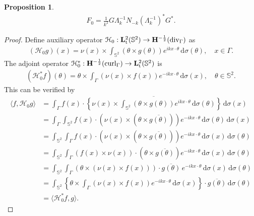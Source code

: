 \documentclass[a4paper,12pt]{article}
\theoremstyle{definition}
\newtheorem{prp}{Proposition}
\newcommand\bdr{\Gamma}
\newcommand\Div{\divv_\bdr}
\newcommand\Curl{\curl_\bdr}
\newcommand\lTT{{\bf L}^2_\text{t}}
\newcommand\lTS{\lTT(\mathbb{S}^2)}
\newcommand\Hhm{{\bf H}^{-\frac{1}{2}}}
\newcommand\lTD{\Hhm(\Div)}
\newcommand\lTC{\Hhm(\Curl)}
\newcommand\ints[2][y]{\int_{\bdr}#2\,\text{d}\sigma(#1)}
\newcommand\intc[2][(\theta)]{\int_{\mathbb{S}^2}#2\,\text{d}\sigma#1}
\DeclareMathOperator\curl{curl}
\DeclareMathOperator\divv{div}
\begin{document}
\begin{prp}
  \begin{align*}
    F_0 = \frac{1}{k^2}G\Lambda_k^{-1}N_{-k}\left(\Lambda_k^{-1}\right)^*G^*.
  \end{align*}
\end{prp}

\begin{proof}
  Define auxiliary operator $\mathcal{H}_0:\lTS\rightarrow\lTD$ as
  \begin{align}
    (\mathcal{H}_0 g)(x)=\nu(x)\times\intc{\left(\theta\times g(\theta)\right)e^{ikx\cdot\theta}},\quad x\in\bdr.
  \end{align}
  The adjoint operator $\mathcal{H}_0^*:\lTC\rightarrow\lTS$ is 
  \begin{align}
    (\mathcal{H}_0^*f)(\theta)=\theta\times\ints[x]{\left(\nu(x)\times f(x)\right)e^{-ik x\cdot\theta}},\quad\theta\in\mathbb{S}^2.
  \end{align}
  This can be verified by
  \begin{align*}
    \langle f, \mathcal{H}_0 g\rangle &= \ints[x]{f(x)\cdot\overline{\left\{\nu(x)\times\intc{\left(\theta\times g(\theta)\right)e^{i k x\cdot\theta}}\right\}}} \\
    &=\ints[x]{\intc{f(x)\cdot \left(\nu(x)\times\left(\theta\times\overline{g(\theta)}\right)\right)e^{-i k x\cdot\theta}}} \\
    &=\intc{\ints[x]{f(x)\cdot \left(\nu(x)\times\left(\theta\times\overline{g(\theta)}\right)\right)e^{-i k x\cdot\theta}}} \\
    &=\intc{\ints[x]{\left(f(x)\times\nu(x)\right)\cdot\left(\theta\times\overline{g(\theta)}\right)e^{-i k x\cdot\theta}}} \\
    &=\intc{\ints[x]{\left(\theta\times\left(\nu(x)\times f(x)\right)\right)\cdot\overline{g(\theta)}\,e^{-i k x\cdot\theta}}} \\
    &=\intc{\left\{\theta\times\ints[x]{\left(\nu(x)\times f(x)\right)e^{-i k x\cdot\theta}}\right\}\cdot\overline{g(\theta)}} \\
    &=\langle\mathcal{H}_0^*f, g\rangle.
  \end{align*} 


\end{proof}
\end{document}
